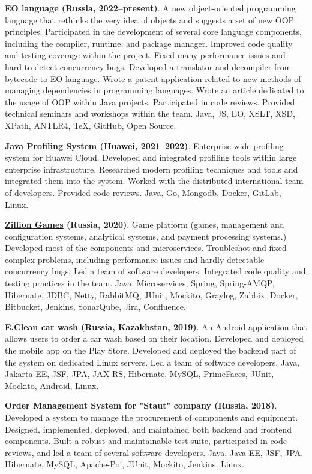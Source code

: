 \documentclass{vl}
\begin{document}
    \textbf{EO language (Russia, 2022--present)}.
    A new object-oriented programming language
    that rethinks the very idea of objects and suggests a set of new OOP principles.
    Participated in the development of several core language components,
    including the compiler, runtime, and package manager.
    Improved code quality and testing coverage within the project.
    Fixed many performance issues and hard-to-detect concurrency bugs.
    Developed a translator and decompiler from bytecode to EO language.
    Wrote a patent application related to new methods of managing dependencies in programming languages.
    Wrote an article dedicated to the usage of OOP within Java projects.
    Participated in code reviews.
    Provided technical seminars and workshops within the team.
    Java, JS, EO, XSLT, XSD, XPath, ANTLR4, TeX, GitHub, Open Source.

    \textbf{Java Profiling System (Huawei, 2021--2022)}.
    Enterprise-wide profiling system for Huawei Cloud.
    Developed and integrated profiling tools within large enterprise infrastructure.
    Researched modern profiling techniques and tools and integrated them into the system.
    Worked with the distributed international team of developers.
    Provided code reviews.
    Java, Go, Mongodb, Docker, GitLab, Linux.

    \textbf{\href{http://zillion.games/}{Zillion Games} (Russia, 2020)}.
    Game platform (games, management and configuration systems, analytical systems, and payment processing systems.)
    Developed most of the components and microservices.
    Troubleshot and fixed complex problems, including performance issues and hardly detectable concurrency bugs.
    Led a team of software developers.
    Integrated code quality and testing practices in the team.
    Java, Microservices, Spring, Spring-AMQP, Hibernate, JDBC, Netty, RabbitMQ, JUnit, Mockito, Graylog, Zabbix, Docker,
    Bitbucket, Jenkins, SonarQube, Jira, Confluence.

    \textbf{E.Clean car wash (Russia, Kazakhstan, 2019)}.
    An Android application that allows users to order a car wash based on their location.
    Developed and deployed the mobile app on the Play Store.
    Developed and deployed the backend part of the system on dedicated Linux servers.
    Led a team of software developers.
    Java, Jakarta EE, JSF, JPA, JAX-RS, Hibernate, MySQL, PrimeFaces, JUnit, Mockito, Android, Linux.

    \textbf{Order Management System for "Staut" company (Russia, 2018)}.
    Developed a system to manage the procurement of components and equipment.
    Designed, implemented, deployed, and maintained both backend and frontend components.
    Built a robust and maintainable test suite, participated in code reviews, and led a team of several software developers.
    Java, Java‐EE, JSF, JPA, Hibernate, MySQL, Apache-Poi, JUnit, Mockito, Jenkins, Linux.
\end{document}
